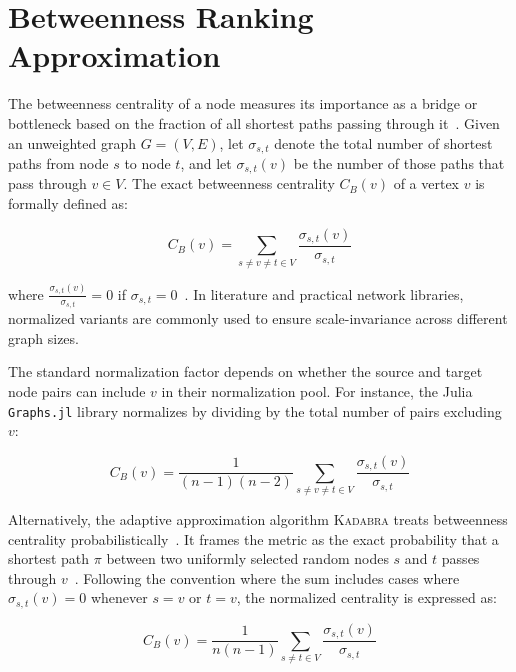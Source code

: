 \section[Betweenness Ranking Approximation]{Betweenness Ranking Approximation}\label{sec:betweenness-ranking-approximation}

The betweenness centrality of a node measures its importance as a bridge or bottleneck based on the fraction of all shortest paths passing through
 it~\parencite{freeman1977set,brandes_faster_2001}.
 Given an unweighted graph $G=(V,E)$, let $\sigma_{s,t}$ denote the total number of shortest paths from node $s$ to node $t$,
  and let $\sigma_{s,t}(v)$ be the number of those paths that pass through $v \in V$.
The exact betweenness centrality $C_B(v)$ of a vertex $v$ is formally defined as:

\begin{equation}
    C_B(v) = \sum_{s \neq v \neq t \in V} \frac{\sigma_{s,t}(v)}{\sigma_{s,t}} \label{eq:betweenness-def}
\end{equation}

where $\frac{\sigma_{s,t}(v)}{\sigma_{s,t}} = 0$ if $\sigma_{s,t} = 0$~\parencite{brandes2001faster}. In literature and practical network libraries, normalized variants are commonly used to ensure scale-invariance across different graph sizes.

The standard normalization factor depends on whether the source and target node pairs can include $v$ in their normalization pool. For instance, the Julia \texttt{Graphs.jl} library normalizes by dividing by the total number of pairs excluding $v$:

\begin{equation}
    C_B(v) = \frac{1}{(n-1)(n-2)}\sum_{s \neq v \neq t \in V} \frac{\sigma_{s,t}(v)}{\sigma_{s,t}} \label{eq:betweenness-julia}
\end{equation}

Alternatively, the adaptive approximation algorithm \textsc{Kadabra} treats betweenness centrality probabilistically~\parencite{borassi_kadabra_2019}.
It frames the metric as the exact probability that a shortest path $\pi$ between two uniformly selected random nodes $s$ and $t$
 passes through $v$~\parencite{borassi2019kadabra}.
Following the convention where the sum includes cases where $\sigma_{s,t}(v)=0$ whenever $s=v$ or $t=v$,
the normalized centrality is expressed as:

\begin{equation}
    C_B(v) = \frac{1}{n(n-1)} \sum_{s \neq t \in V} \frac{\sigma_{s,t}(v)}{\sigma_{s,t}} \label{eq:betweenness-kadabra}
\end{equation}


